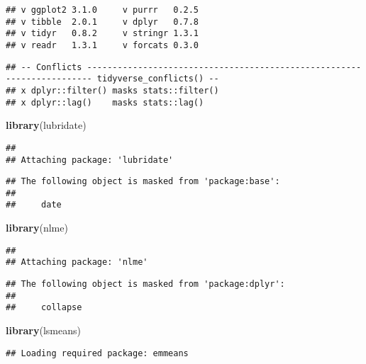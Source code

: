 \documentclass[]{article}
\newenvironment{Shaded}{\begin{snugshade}}{\end{snugshade}}
\newcommand{\KeywordTok}[1]{\textcolor[rgb]{0.13,0.29,0.53}{\textbf{#1}}}
\newcommand{\NormalTok}[1]{#1}
\begin{document}
\begin{verbatim}
## v ggplot2 3.1.0     v purrr   0.2.5
## v tibble  2.0.1     v dplyr   0.7.8
## v tidyr   0.8.2     v stringr 1.3.1
## v readr   1.3.1     v forcats 0.3.0
\end{verbatim}

\begin{verbatim}
## -- Conflicts ----------------------------------------------------------------------- tidyverse_conflicts() --
## x dplyr::filter() masks stats::filter()
## x dplyr::lag()    masks stats::lag()
\end{verbatim}

\begin{Shaded}
\begin{Highlighting}[]
\KeywordTok{library}\NormalTok{(lubridate)}
\end{Highlighting}
\end{Shaded}

\begin{verbatim}
## 
## Attaching package: 'lubridate'
\end{verbatim}

\begin{verbatim}
## The following object is masked from 'package:base':
## 
##     date
\end{verbatim}

\begin{Shaded}
\begin{Highlighting}[]
\KeywordTok{library}\NormalTok{(nlme)}
\end{Highlighting}
\end{Shaded}

\begin{verbatim}
## 
## Attaching package: 'nlme'
\end{verbatim}

\begin{verbatim}
## The following object is masked from 'package:dplyr':
## 
##     collapse
\end{verbatim}

\begin{Shaded}
\begin{Highlighting}[]
\KeywordTok{library}\NormalTok{(lsmeans)}
\end{Highlighting}
\end{Shaded}

\begin{verbatim}
## Loading required package: emmeans
\end{verbatim}
\end{document}
